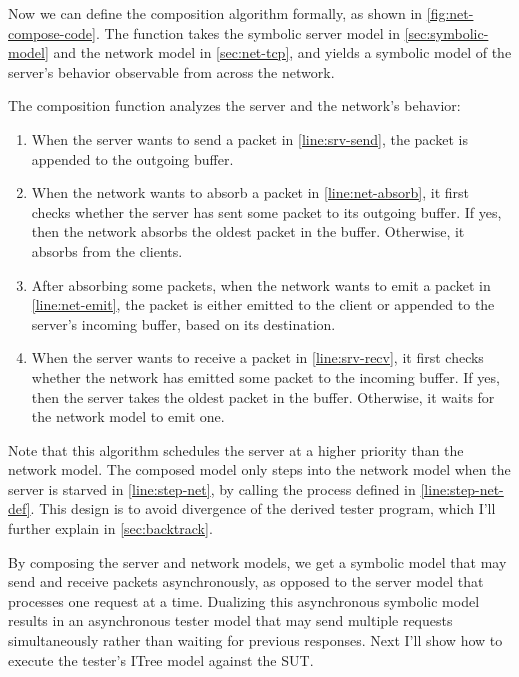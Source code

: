 Now we can define the composition algorithm formally, as shown in
\autoref{fig:net-compose-code}.  The function takes the symbolic server model
in \autoref{sec:symbolic-model} and the network model in \autoref{sec:net-tcp},
and yields a symbolic model of the server's behavior observable from across the
network.

The composition function analyzes the server and the network's behavior:
\begin{enumerate}
\item When the server wants to send a packet in \autoref{line:srv-send}, the
packet is appended to the outgoing buffer.
\item When the network wants to absorb a packet in \autoref{line:net-absorb},
it first checks whether the server has sent some packet to its outgoing buffer.
If yes, then the network absorbs the oldest packet in the buffer.  Otherwise, it
absorbs from the clients.
\item After absorbing some packets, when the network wants to emit a packet in
\autoref{line:net-emit}, the packet is either emitted to the client or appended
to the server's incoming buffer, based on its destination.
\item When the server wants to receive a packet in \autoref{line:srv-recv},
it first checks whether the network has emitted some packet to the incoming
buffer.  If yes, then the server takes the oldest packet in the buffer.
Otherwise, it waits for the network model to emit one.
\end{enumerate}

Note that this algorithm schedules the server at a higher priority than the
network model.  The composed model only steps into the network model when the
server is starved in \autoref{line:step-net}, by calling the 
process defined in \autoref{line:step-net-def}.  This design is to avoid
divergence of the derived tester program, which I'll further explain in
\autoref{sec:backtrack}.

By composing the server and network models, we get a symbolic model that may
send and receive packets asynchronously, as opposed to the server model that
processes one request at a time.  Dualizing this asynchronous symbolic model
results in an asynchronous tester model that may send multiple requests
simultaneously rather than waiting for previous responses.  Next I'll show how
to execute the tester's ITree model against the SUT.
